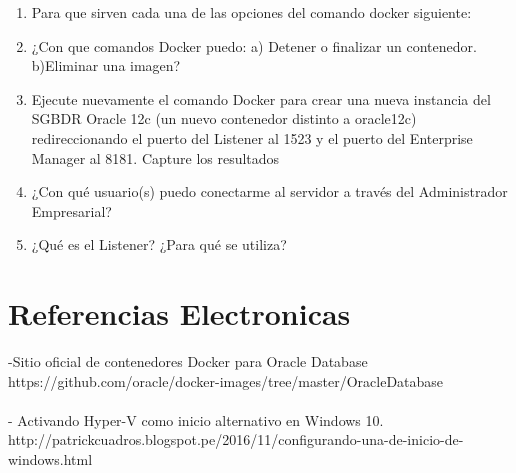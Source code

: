 \documentclass[12pt,letterpaper]{article}
\begin{document}
\begin{enumerate}[1.]
    \item  Para que sirven cada una de las opciones del comando docker siguiente:
     
    \item ¿Con que comandos Docker puedo: a) Detener o finalizar un contenedor. b)Eliminar una
imagen?



\item Ejecute nuevamente el comando Docker para crear una nueva instancia del SGBDR Oracle
12c (un nuevo contenedor distinto a oracle12c) redireccionando el puerto del Listener al 1523
y el puerto del Enterprise Manager al 8181. Capture los resultados



\item ¿Con qué usuario(s) puedo conectarme al servidor a través del Administrador Empresarial?

\item ¿Qué es el Listener? ¿Para qué se utiliza?


		\end{enumerate}


\section{Referencias Electronicas } 

-Sitio oficial de contenedores Docker para Oracle Database\\
https://github.com/oracle/docker-images/tree/master/OracleDatabase\\ \\
- Activando Hyper-V como inicio alternativo en Windows 10.\\
http://patrickcuadros.blogspot.pe/2016/11/configurando-una-de-inicio-de-windows.html
\end{document}
